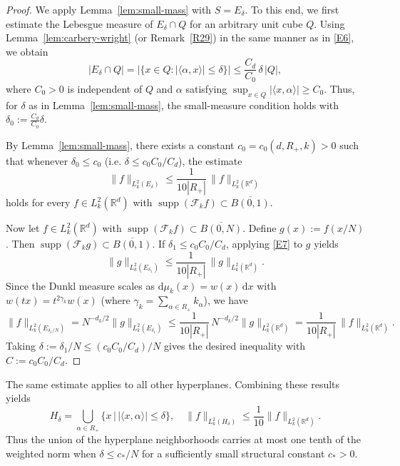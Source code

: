 \documentclass[12pt]{article}
\DeclareMathOperator{\supp}{supp}
\begin{document}
\begin{proof}
We apply Lemma~\ref{lem:small-mass} with $S = E_\delta$. To this end, we first estimate the Lebesgue measure of $E_\delta \cap Q$ for an arbitrary unit cube $Q$. Using Lemma~\ref{lem:carbery-wright} (or Remark~\ref{R29}) in the same manner as in \eqref{E6}, we obtain
\[
|E_\delta \cap Q|
= \bigl| \bigl\{ x \in Q : |\langle \alpha, x \rangle| \le \delta \bigr\} \bigr|
\le \frac{C_d}{C_0} \, \delta \, |Q|,
\]
where $C_0>0$ is independent of $Q$ and $\alpha$ satisfying $\sup_{x\in Q}|\langle x,\alpha\rangle|\geq C_0$.
Thus, for $\delta $ as in Lemma~\ref{lem:small-mass}, the small-measure condition holds with $\delta _0 := \frac{C_d}{C_0}\delta$.

By Lemma~\ref{lem:small-mass}, there exists a constant $c_0 = c_0(d, R_+, k) > 0$ such that whenever $\delta _0 \le c_0$ (i.e. $\delta \le c_0 C_0/C_d$), the estimate
\begin{equation}\label{E7}
\| f \|_{L_k^2(E_\delta)} \le \frac{1}{10|R_+|} \, \| f \|_{L_k^2(\mathbb{R}^d)}
\end{equation}
holds for every $f \in L_k^2(\mathbb{R}^d)$ with $\supp(\mathcal{F}_k f) \subset \overline{B(0,1)}$.

Now let $f \in L_k^2(\mathbb{R}^d)$ with $\supp(\mathcal{F}_k f) \subset \overline{B(0,N)}$. Define $g(x) := f(x/N)$. Then $\supp(\mathcal{F}_k g) \subset \overline{B(0,1)}$. If $\delta_1 \le c_0 C_0/C_d$, applying \eqref{E7} to $g$ yields
\[
\| g \|_{L_k^2(E_{\delta_1})} \le \frac{1}{10|R_+|} \, \| g \|_{L_k^2(\mathbb{R}^d)}.
\]
Since the Dunkl measure scales as $\mathrm{d}\mu_k(x) = w(x)\,\mathrm{d}x$ with $w(t x) = t^{2\gamma_k} w(x)$ (where $\gamma_k = \sum_{\alpha\in R_+} k_\alpha$), we have
\[
\| f \|_{L_k^2(E_{\delta_1/N})}
= N^{-d_k/2} \| g \|_{L_k^2(E_{\delta_1})}
\le \frac{1}{10|R_+|} \, N^{-d_k/2} \| g \|_{L_k^2(\mathbb{R}^d)}
= \frac{1}{10|R_+|} \, \| f \|_{L_k^2(\mathbb{R}^d)}.
\]
Taking $\delta := \delta_1/N \le (c_0 C_0/C_d)/N$ gives the desired inequality with $C := c_0 C_0/C_d$.
\end{proof}

\begin{remark}\label{R1}
The same estimate applies to all other hyperplanes. Combining these results yields
\begin{equation}\label{ER1SM}
H_\delta=\bigcup_{\alpha\in R_+}\bigl\{x\,\big|\,|\langle x,\alpha\rangle|\leq \delta\bigr\},\quad
\|f\|_{L_k^2(H_\delta)}\leq \frac{1}{10}\|f\|_{L_k^2(\mathbb{R}^d)}.
\end{equation}
Thus the union of the hyperplane neighborhoods carries at most one tenth of the weighted norm when $\delta\le c_*/N$ for a sufficiently small structural constant $c_*>0$.
\end{remark}
\end{document}
